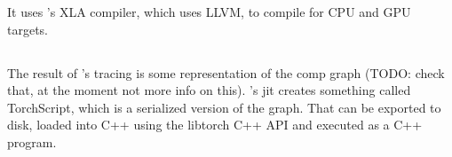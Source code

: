 \documentclass[paper=a4,11pt,headsepline]{scrartcl}
\begin{document}
It uses \tf's XLA compiler, which uses LLVM, to compile for CPU and GPU targets.

\subsection{\pytorch}

The result of \pytorch's tracing is some representation of the comp graph
(TODO: check that, at the moment not more info on this). \pytorch's jit creates
something called TorchScript, which is a serialized version of the graph. That
can be exported to disk, loaded into C++ using the libtorch C++ API and
executed as a C++ program.

\nocite{*}
\printbibliography
\end{document}
